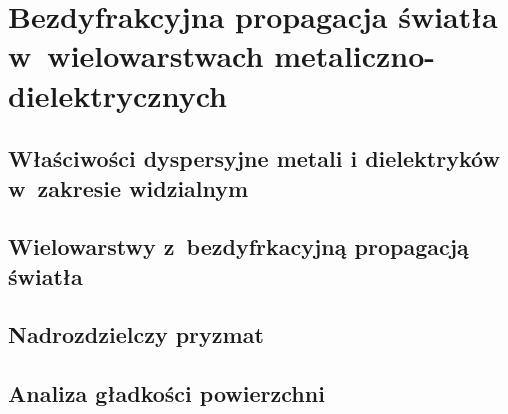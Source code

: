 \chapter{Bezdyfrakcyjna propagacja światła w~wielowarstwach metaliczno-dielektrycznych}
\label{art:nondiff}

\section{Właściwości dyspersyjne metali i dielektryków w~zakresie widzialnym}

\section{Wielowarstwy z~bezdyfrkacyjną propagacją światła}

\section{Nadrozdzielczy pryzmat}


\section{Analiza gładkości powierzchni}



